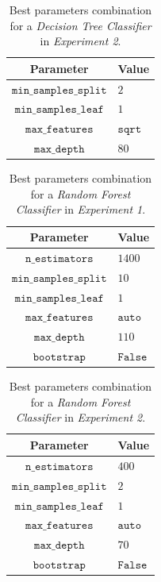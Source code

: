 \documentclass[sigplan,screen]{acmart}
\begin{document}
\begin{table}[h]
  \caption{Best parameters combination for a \emph{Decision Tree Classifier} in \emph{Experiment 2}.}
  \label{tab:dc_2}
  \begin{tabular}{cl}
    \toprule
    \textbf{Parameter}&\textbf{Value}\\
    \midrule
    $\texttt{min\_samples\_split}$ & $2$ \\
    $\texttt{min\_samples\_leaf}$ & $1$ \\
    $\texttt{max\_features}$ & $\texttt{sqrt}$ \\
    $\texttt{max\_depth}$ & $80$ \\
    \bottomrule
    \end{tabular}
\end{table}

\begin{table}[h]
  \caption{Best parameters combination for a \emph{Random Forest Classifier} in \emph{Experiment 1}.}
  \label{tab:rf_1}
  \begin{tabular}{cl}
    \toprule
    \textbf{Parameter}&\textbf{Value}\\
    \midrule
    $\texttt{n\_estimators}$ & $1400$\\
    $\texttt{min\_samples\_split}$ & $10$ \\
    $\texttt{min\_samples\_leaf}$ & $1$ \\
    $\texttt{max\_features}$ & $\texttt{auto}$ \\
    $\texttt{max\_depth}$ & $110$ \\
    $\texttt{bootstrap}$ & $\texttt{False}$ \\
    \bottomrule
    \end{tabular}
\end{table}

\begin{table}[h]
  \caption{Best parameters combination for a \emph{Random Forest Classifier} in \emph{Experiment 2}.}
  \label{tab:rf_2}
  \begin{tabular}{cl}
    \toprule
    \textbf{Parameter}&\textbf{Value}\\
    \midrule
    $\texttt{n\_estimators}$ & $400$\\
    $\texttt{min\_samples\_split}$ & $2$ \\
    $\texttt{min\_samples\_leaf}$ & $1$ \\
    $\texttt{max\_features}$ & $\texttt{auto}$ \\
    $\texttt{max\_depth}$ & $70$ \\
    $\texttt{bootstrap}$ & $\texttt{False}$ \\
    \bottomrule
    \end{tabular}
\end{table}
\end{document}
